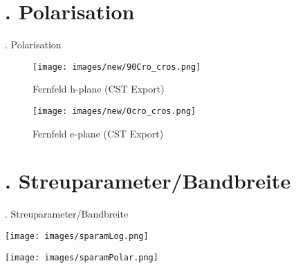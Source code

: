 \documentclass[
  aspectratio=169, %
]{beamer}
\begin{document}
\section{\thesection. Polarisation}
\begin{frame}{\thesection. Polarisation}
    \begin{figure}
        \centering
        \begin{minipage}[t]{0.49\textwidth}
            \centering
            \texttt{[image: images/new/90Cro\_cros.png]}
            \caption{Fernfeld h-plane (CST Export)}
        \end{minipage}
        \hfill
        \begin{minipage}[t]{0.49\textwidth}
            \centering
            \texttt{[image: images/new/0cro\_cros.png]}
            \caption{Fernfeld e-plane (CST Export)}
        \end{minipage}
    \end{figure}
\end{frame}

\section{\thesection. Streuparameter/Bandbreite}
\begin{frame}{\thesection. Streuparameter/Bandbreite}
    \begin{minipage}[t]{0.48\textwidth}
        \centering
        \texttt{[image: images/sparamLog.png]}
    \end{minipage}
    \hfill
    \begin{minipage}[t]{0.48\textwidth}
        \centering
        \texttt{[image: images/sparamPolar.png]}
    \end{minipage}
\end{frame}

\end{document}
